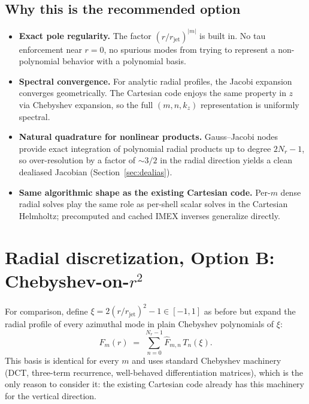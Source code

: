 \documentclass[11pt]{article}
\newcommand{\rjet}{r_{\mathrm{jet}}}
\begin{document}
\subsection{Why this is the recommended option}

\begin{itemize}[leftmargin=1.5em]
  \item \textbf{Exact pole regularity.}  The factor $(r/\rjet)^{|m|}$
  is built in.  No tau enforcement near $r=0$, no spurious modes from
  trying to represent a non-polynomial behavior with a polynomial
  basis.
  \item \textbf{Spectral convergence.}  For analytic radial profiles,
  the Jacobi expansion converges geometrically.  The Cartesian code
  enjoys the same property in $z$ via Chebyshev expansion, so the
  full $(m, n, k_{z})$ representation is uniformly spectral.
  \item \textbf{Natural quadrature for nonlinear products.}
  Gauss--Jacobi nodes provide exact integration of polynomial radial
  products up to degree $2N_{r} - 1$, so over-resolution by a factor
  of $\sim 3/2$ in the radial direction yields a clean dealiased
  Jacobian (Section~\ref{sec:dealias}).
  \item \textbf{Same algorithmic shape as the existing Cartesian
  code.}  Per-$m$ dense radial solves play the same role as
  per-shell scalar solves in the Cartesian Helmholtz; precomputed and
  cached IMEX inverses generalize directly.
\end{itemize}

\section{Radial discretization, Option B: Chebyshev-on-$r^{2}$}
\label{sec:radialB}

For comparison, define $\xi = 2(r/\rjet)^{2} - 1 \in [-1, 1]$ as
before but expand the radial profile of every azimuthal mode in
plain Chebyshev polynomials of $\xi$:
\begin{equation}
  F_{m}(r) \;=\; \sum_{n=0}^{N_{r}-1} \widehat{F}_{m,n}\,T_{n}(\xi).
  \label{eq:Cheb-r2-basis}
\end{equation}
This basis is identical for every $m$ and uses standard Chebyshev
machinery (DCT, three-term recurrence, well-behaved differentiation
matrices), which is the only reason to consider it: the existing
Cartesian code already has this machinery for the vertical direction.
\end{document}
